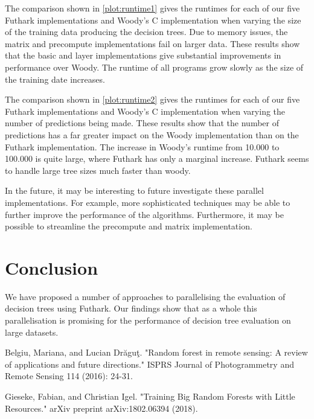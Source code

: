 \documentclass[a4paper]{article}
\begin{document}
The comparison shown in \ref{plot:runtime1} gives the runtimes for each of our five Futhark implementations and Woody's C implementation when varying the size of the training data producing the decision trees. Due to memory issues, the matrix and precompute implementations fail on larger data. These results show that the basic and layer implementations give substantial improvements in performance over Woody. The runtime of all programs grow slowly as the size of the training date increases.

The comparison shown in \ref{plot:runtime2} gives the runtimes for each of our five Futhark implementations and Woody's C implementation when varying the number of predictions being made. These results show that the number of predictions has a far greater impact on the Woody implementation than on the Futhark implementation. The increase in Woody's runtime from 10.000 to 100.000 is quite large, where Futhark has only a marginal increase. Futhark seems to handle large tree sizes much faster than woody.

In the future, it may be interesting to future investigate these parallel implementations. For example, more sophisticated techniques may be able to further improve the performance of the algorithms. Furthermore, it may be possible to streamline the precompute and matrix implementation.

\newpage
\section{Conclusion}

We have proposed a number of approaches to parallelising the evaluation of decision trees using Futhark. Our findings show that as a whole this parallelisation is promising for the performance of decision tree evaluation on large datasets.

\begin{thebibliography}{}

Belgiu, Mariana, and Lucian Drăguţ. "Random forest in remote sensing: A review of applications and future directions." ISPRS Journal of Photogrammetry and Remote Sensing 114 (2016): 24-31.

Gieseke, Fabian, and Christian Igel. "Training Big Random Forests with Little Resources." arXiv preprint arXiv:1802.06394 (2018).

\end{thebibliography}
\end{document}
